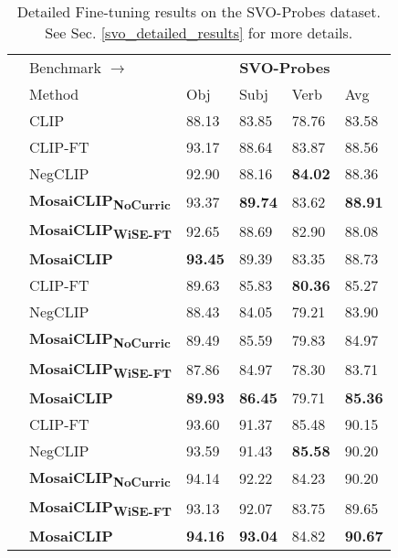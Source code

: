 \documentclass[11pt]{article}
\newcommand{\methodcompbold}{\textbf{MosaiCLIP}}
\newcommand{\methodcompNoCurricbold}{\textbf{MosaiCLIP\textsubscript{NoCurric}}}
\newcommand{\methodcompwiseftbold}{\textbf{MosaiCLIP\textsubscript{WiSE-FT}}}
\newcommand{\clip}{CLIP}
\newcommand{\negclip}{NegCLIP}
\begin{document}
\begin{table}[h!]
\footnotesize
  \centering
  \begin{tabular}{p{0.15cm}p{2.2cm}p{0.7cm}p{0.7cm}p{0.7cm}p{0.7cm}}
      \toprule
      & \multicolumn{1}{l}{Benchmark $\rightarrow$} & \multicolumn{4}{c}{\textbf{SVO-Probes}} \\
      \cmidrule(lr){3-6}
      & Method & Obj & Subj & Verb & Avg \\ 
      \cmidrule{2-6}
       & \clip{} & 88.13 & 83.85 & 78.76 & 83.58 \\ 
       \midrule
       & \clip{}-FT & 93.17 & 88.64 & 83.87 & 88.56 \\ 
       & \negclip{} & 92.90 & 88.16 & \textbf{84.02} & 88.36 \\ 
       \rowcolor{cyan!12}
       \cellcolor{white}
       & \methodcompNoCurricbold{} & 93.37 & \textbf{89.74} & 83.62 & \textbf{88.91} \\ 
       \rowcolor{cyan!12}
       \cellcolor{white}
       & \methodcompwiseftbold{} & 92.65 & 88.69 & 82.90 & 88.08 \\ 
       \rowcolor{cyan!12}
       \cellcolor{white} \multirow{-5}{*}{\rotatebox[origin=c]{90}{CC-100K}}
       & \methodcompbold{} & \textbf{93.45} & 89.39 & 83.35 & 88.73 \\ 
      \midrule
       & \clip{}-FT & 89.63 & 85.83 & \textbf{80.36} & 85.27 \\ 
       & \negclip{} & 88.43 & 84.05 & 79.21 & 83.90 \\ 
       \rowcolor{cyan!12}
       \cellcolor{white}
       & \methodcompNoCurricbold{} & 89.49 & 85.59 & 79.83 & 84.97 \\ 
       \rowcolor{cyan!12}
       \cellcolor{white}
       & \methodcompwiseftbold{} & 87.86 & 84.97 & 78.30 & 83.71 \\
       \rowcolor{cyan!12}
       \cellcolor{white} \multirow{-5}{*}{\rotatebox[origin=c]{90}{YFCC-100K}}
       & \methodcompbold{} & \textbf{89.93} & \textbf{86.45} & 79.71 & \textbf{85.36} \\
      \midrule
       & \clip{}-FT & 93.60 & 91.37 & 85.48 & 90.15 \\ 
       & \negclip{} & 93.59 & 91.43 & \textbf{85.58} & 90.20 \\ 
       \rowcolor{cyan!12}
       \cellcolor{white}
       & \methodcompNoCurricbold{} & 94.14 & 92.22 & 84.23 & 90.20 \\ 
       \rowcolor{cyan!12}
       \cellcolor{white}
       & \methodcompwiseftbold{} & 93.13 & 92.07 & 83.75 & 89.65 \\
       \rowcolor{cyan!12}
       \cellcolor{white} \multirow{-5}{*}{\rotatebox[origin=c]{90}{COCO}}
       & \methodcompbold{} & \textbf{94.16} & \textbf{93.04} & 84.82 & \textbf{90.67} \\
      \bottomrule
  \end{tabular}

  \caption{Detailed Fine-tuning results on the {\color{blue} SVO-Probes} dataset. See Sec. \ref{svo_detailed_results} for more details.}
  \label{detailed_svo_fine_tune}
\end{table}
\end{document}
